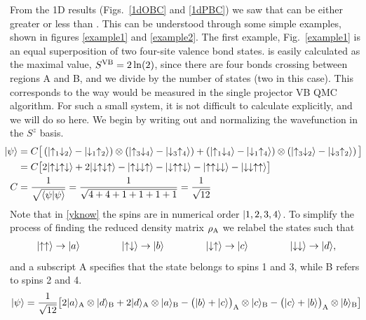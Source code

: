 From the 1D results (Figs.~\ref{1dOBC} and \ref{1dPBC}) we saw that \vb can be either greater or less than \vN.
This can be understood through some simple examples, shown in figures \ref{example1} and \ref{example2}.
The first example, Fig.~\ref{example1} is an equal superposition of two four-site valence bond states. 
 \vb is easily calculated as the maximal value, $S^{\text{VB}} = 2\ln(2)$, since there are four bonds crossing between regions A and B, and we divide by the number of states (two in this case).
This corresponds to the way \vb would be measured in the single projector VB QMC algorithm.
 For such a small system, it is not difficult to calculate \vn explicitly, and we will do so here.
 We begin by writing out and normalizing the wavefunction in the $S^z$ basis.
 \begin{align}
\hspace{-2mm}
 \ket{\psi} &= C \big[ \left( \ket{\up_1\dw_2} - \ket{\dw_1\up_2}\right) \otimes 
 		\left( \ket{\up_3\dw_4} - \ket{\dw_3\up_4}\right) + 
		\left( \ket{\up_1\dw_4} - \ket{\dw_1\up_4}\right) \otimes 
 		\left( \ket{\up_3\dw_2} - \ket{\dw_3\up_2}\right) \big] \\
		&= C \big[ 2\ket{\up\dw\up\dw} + 2 \ket{\dw\up\dw\up} -
			\ket{\up\dw\dw\up} -\ket{\dw\up\up\dw} - \ket{\up\up\dw\dw} - \ket{\dw\dw\up\up}
			\big] \label{yknow}\\
C &= \frac{1}{\sqrt{\bra{\psi}\psi\rangle}} = \frac{1}{\sqrt{4+4+1+1+1+1}} = \frac{1}{\sqrt{12}}
 \end{align}
 Note that in \eqref{yknow} the spins are in numerical order $\lvert {1,2,3,4} \rangle$.
 To simplify the process of finding the reduced density matrix $\rho_{\rm A}$ we relabel the states such that
 \begin{eqnarray}
 \ket{\up\up} \rightarrow \ket{a} \hspace{15mm} \ket{\up\dw} \rightarrow \ket{b}  \hspace{15mm} 
 \ket{\dw\up} \rightarrow \ket{c}  \hspace{15mm} \ket{\dw\dw} \rightarrow \ket{d},
 \end{eqnarray}
and a subscript A specifies that the state belongs to spins 1 and 3, while B refers to spins 2 and 4. 
 \begin{eqnarray}
\lvert {\psi} \rangle = \frac{1}{\sqrt{12}} \big[ 
		2\lvert {a} \rangle_{\rm A}\otimes \lvert {d} \rangle_{\rm B} + 
		2\lvert {d} \rangle_{\rm A}\otimes \lvert {a} \rangle_{\rm B} 
		- \big(\lvert {b} \rangle +\lvert {c} \rangle\big)_{\rm A} \otimes  \lvert {c} \rangle_{\rm B} 
		 -\big(\lvert {c} \rangle +\lvert {b} \rangle\big)_{\rm A} \otimes \lvert {b} \rangle_{\rm B}
		\big]
 \end{eqnarray}
